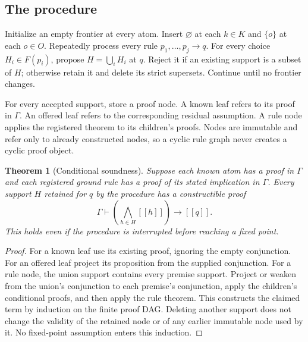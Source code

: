 \documentclass[11pt,a4paper]{article}
\newcommand{\ev}[1]{[\![#1]\!]}
\newtheorem{theorem}{Theorem}[section]
\theoremstyle{definition}
\theoremstyle{remark}
\begin{document}
\subsection{The procedure}
Initialize an empty frontier at every atom. Insert $\varnothing$ at each $k\in K$ and $\{o\}$ at each $o\in O$. Repeatedly process every rule $p_1,\ldots,p_j\to q$. For every choice $H_i\in F(p_i)$, propose $H=\bigcup_i H_i$ at $q$. Reject it if an existing support is a subset of $H$; otherwise retain it and delete its strict supersets. Continue until no frontier changes.

For every accepted support, store a proof node. A known leaf refers to its proof in $\Gamma$. An offered leaf refers to the corresponding residual assumption. A rule node applies the registered theorem to its children's proofs. Nodes are immutable and refer only to already constructed nodes, so a cyclic rule graph never creates a cyclic proof object.

\begin{theorem}[Conditional soundness]\label{thm:conditional}
Suppose each known atom has a proof in $\Gamma$ and each registered ground rule has a proof of its stated implication in $\Gamma$. Every support $H$ retained for $q$ by the procedure has a constructible proof
\[
 \Gamma\vdash\left(\bigwedge_{h\in H}\ev{h}\right)\to\ev{q}.
\]
This holds even if the procedure is interrupted before reaching a fixed point.
\end{theorem}
\begin{proof}
For a known leaf use its existing proof, ignoring the empty conjunction. For an offered leaf project its proposition from the supplied conjunction. For a rule node, the union support contains every premise support. Project or weaken from the union's conjunction to each premise's conjunction, apply the children's conditional proofs, and then apply the rule theorem. This constructs the claimed term by induction on the finite proof DAG. Deleting another support does not change the validity of the retained node or of any earlier immutable node used by it. No fixed-point assumption enters this induction.
\end{proof}
\end{document}
